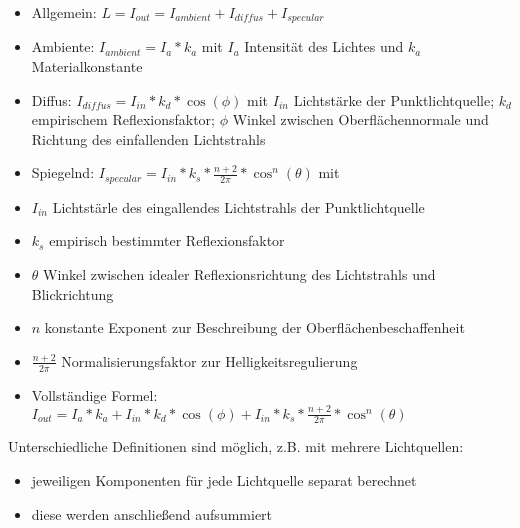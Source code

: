 \documentclass[10pt,landscape]{article}
\begin{document}
\begin{multicols}{3}
{  %
  
  \begin{itemize}
    \item Allgemein: $L=I_{out}=I_{ambient}+I_{diffus}+I_{specular}$
    \item Ambiente: $I_{ambient}=I_a * k_a$ mit $I_a$ Intensität des Lichtes und $k_a$ Materialkonstante
    \item Diffus: $I_{diffus}=I_{in}*k_d*\cos(\phi)$ mit $I_{in}$ Lichtstärke der Punktlichtquelle; $k_d$ empirischem Reflexionsfaktor; $\phi$ Winkel zwischen Oberflächennormale und Richtung des einfallenden Lichtstrahls
    \item Spiegelnd: $I_{specular}=I_{in}*k_s*\frac{n+2}{2\pi}*\cos^n({\theta})$ mit
    \item $I_{in}$ Lichtstärle des eingallendes Lichtstrahls der Punktlichtquelle
    \item $k_s$ empirisch bestimmter Reflexionsfaktor
    \item $\theta$ Winkel zwischen idealer Reflexionsrichtung des Lichtstrahls und Blickrichtung
    \item $n$ konstante Exponent zur Beschreibung der Oberflächenbeschaffenheit
    \item $\frac{n+2}{2\pi}$ Normalisierungsfaktor zur Helligkeitsregulierung
    \item Vollständige Formel: $I_{out}=I_a*k_a+I_{in}*k_d*\cos(\phi)+I_{in}*k_s*\frac{n+2}{2\pi}*\cos^n(\theta)$
  \end{itemize}
  Unterschiedliche Definitionen sind möglich, z.B. mit mehrere Lichtquellen:
  \begin{itemize}
    \item jeweiligen Komponenten für jede Lichtquelle separat berechnet
    \item diese werden anschließend aufsummiert
  \end{itemize}
  
}
\end{multicols}
\end{document}

